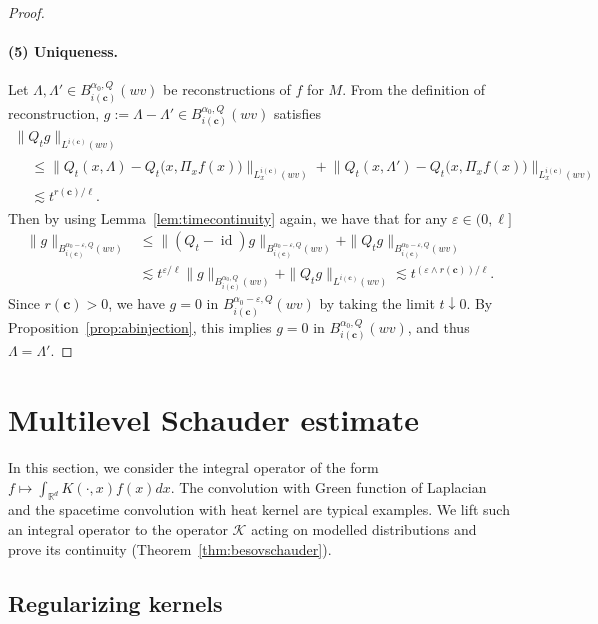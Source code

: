 \documentclass[AHL,Unicode,longabstracts,published]{cedram}
\newcommand{\bbR}{\mathbb{R}}
\newcommand{\bfc}{\mathbf{c}}
\newcommand{\mcK}{\mathcal{K}}
\DeclareMathOperator{\id}{id}
\begin{document}
\begin{proof}

\paragraph*{(5) Uniqueness.}
Let $\Lambda,\Lambda'\in B_{i(\bfc)}^{\alpha_0,Q}(wv)$ be reconstructions of $f$ for $M$. From the definition of reconstruction, $g:=\Lambda-\Lambda'\in B_{i(\bfc)}^{\alpha_0,Q}(wv)$ satisfies
\begin{multline*}
\|Q_tg\|_{L^{i(\bfc)}(wv)}\\
\begin{aligned}
&\le\big\|Q_t(x,\Lambda)-Q_t\big(x,\Pi_xf(x)\big)\big\|_{L_x^{i(\bfc)}(wv)}+\big\|Q_t(x,\Lambda')-Q_t\big(x,\Pi_xf(x)\big)\big\|_{L_x^{i(\bfc)}(wv)}\\
&\lesssim t^{r(\bfc)/\ell}.
\end{aligned}
\end{multline*}
Then by using Lemma~\ref{lem:timecontinuity} again, we have that for any $\varepsilon\in(0,\ell]$
\begin{align*}
\|g\|_{B_{i(\bfc)}^{\alpha_0-\varepsilon,Q}(wv)}&\le\|(Q_t-\id)g\|_{B_{i(\bfc)}^{\alpha_0-\varepsilon,Q}(wv)}+\|Q_tg\|_{B_{i(\bfc)}^{\alpha_0-\varepsilon,Q}(wv)}\\
&\lesssim t^{\varepsilon/\ell}\|g\|_{B_{i(\bfc)}^{\alpha_0,Q}(wv)}+\|Q_tg\|_{L^{i(\bfc)}(wv)}
\lesssim t^{(\varepsilon\wedge r(\bfc))/\ell}.
\end{align*}
Since $r(\bfc)>0$, we have $g=0$ in $B_{i(\bfc)}^{\alpha_0-\varepsilon,Q}(wv)$ by taking the limit $t\downarrow0$. By Proposition~\ref{prop:abinjection}, this implies $g=0$ in $B_{i(\bfc)}^{\alpha_0,Q}(wv)$, and thus $\Lambda=\Lambda'$.
\end{proof}

\section{Multilevel Schauder estimate}\label{section:schauder}

In this section, we consider the integral operator of the form $f\mapsto \int_{\bbR^d}K(\cdot,x)f(x)dx$. The convolution with Green function of Laplacian and the spacetime convolution with heat kernel are typical examples. We lift such an integral operator to the operator $\mcK$ acting on modelled distributions and prove its continuity (Theorem~\ref{thm:besovschauder}).

\subsection{Regularizing kernels}
\end{document}
